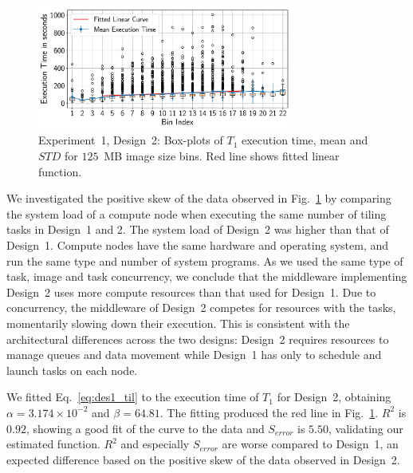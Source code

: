 \begin{figure}[t]
    \centering
    \includegraphics[width=0.75\textwidth]{figures/designs/stage_0_tx_box_des2.pdf}
    \caption{Experiment~1, Design~2: Box-plots of $T_{1}$ execution time, mean and $STD$ for $125$~MB image size bins.
        Red line shows fitted linear function.}\label{fig:stage_1_execution_des2}
\end{figure}


We investigated the positive skew of the data observed in Fig.~\ref{fig:stage_1_execution_des2} by comparing the system load of a compute node when executing the same number of tiling tasks in Design~1 and 2.
The system load of Design~2 was higher than that of Design~1.
Compute nodes have the same hardware and operating system, and run the same type and number of system programs.
As we used the same type of task, image and task concurrency, we conclude that the middleware implementing Design~2 uses more compute resources than that used for Design~1.
Due to concurrency, the middleware of Design~2 competes for resources with the tasks, momentarily slowing down their execution.
This is consistent with the architectural differences across the two designs: Design~2 requires resources to manage queues and data movement while Design~1 has only to schedule and launch tasks on each node.

We fitted Eq.~\ref{eq:des1_til} to the execution time of $T_1$ for Design~2, obtaining $\alpha = 3.174 \times 10^{-2}$ and $\beta = 64.81$.
The fitting produced the red line in Fig.~\ref{fig:stage_1_execution_des2}.
$R^{2}$ is $0.92$, showing a good fit of the curve to the data and $S_{error}$ is $5.50$, validating our estimated function.
$R^2$ and especially $S_{error}$ are worse compared to Design~1, an expected difference based on the positive skew of the data observed in Design~2.


